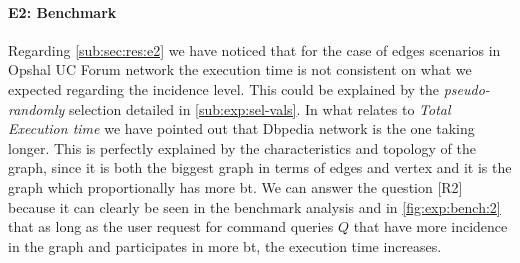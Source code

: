 \paragraph{E2: Benchmark} Regarding \autoref{sub:sec:res:e2} we have noticed that for the case of edges scenarios in Opshal UC Forum network the execution time is not consistent on what we expected regarding the incidence level. This could be explained by the \emph{pseudo-randomly} selection detailed in \autoref{sub:exp:sel-vals}.
In what relates to \emph{Total Execution time} we have pointed out that Dbpedia network is the one taking longer. This is perfectly explained by the characteristics and topology of the graph, since it is both the biggest graph in terms of edges and vertex and it is the graph which proportionally has more \acrshort{bt}. 
We can answer the question [R2] because it can clearly be seen in the benchmark analysis and in \autoref{fig:exp:bench:2} that as long as the user request for command queries $Q$ that have more incidence in the graph and participates in more \acrshort{bt},
the execution time increases.


